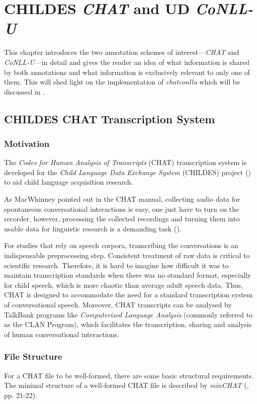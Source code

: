 \chapter{CHILDES \emph{CHAT} and UD \emph{CoNLL-U}}
\label{Chapter2}

This chapter introduces the two annotation schemes of interest---\emph{CHAT} and \emph{CoNLL-U}---in detail and gives the reader an idea of what information is shared by both annotations and what information is exclusively relevant to only one of them. This will shed light on the implementation of \emph{chatconllu} which will be discussed in .

\section{CHILDES CHAT Transcription System}

\subsection{Motivation}
The \emph{Codes for Human Analysis of Transcripts} (CHAT) transcription system is developed for the \emph{Child Language Data Exchange System} (CHILDES) project (\cite{Macwhinney2000}) to aid child language acquisition research.

As MacWhinney pointed out in the CHAT manual, collecting audio data for spontaneous conversational interactions is easy, one just have to turn on the recorder, however, processing the collected recordings and turning them into usable data for linguistic research is a demanding task (\cite{Macwhinney2000}).

For studies that rely on speech corpora, transcribing the conversations is an indispensable preprocessing step. Consistent treatment of raw data is critical to scientific research. Therefore, it is hard to imagine how difficult it was to maintain transcription standards when there was no standard format, especially for child speech, which is more chaotic than average adult speech data. Thus, CHAT is designed to accommodate the need for a standard transcription system of conversational speech. Moreover, CHAT transcripts can be analysed by TalkBank programs  like \emph{Computerized Language Analysis} (commonly referred to as the CLAN Program), which facilitates the transcription, sharing and analysis of human conversational interactions.

\subsection{File Structure}
For a CHAT file to be well-formed, there are some basic structural requirements. The minimal structure of a well-formed CHAT file is described by \emph{minCHAT} (\cite{Macwhinney2000}, pp. 21-22).

